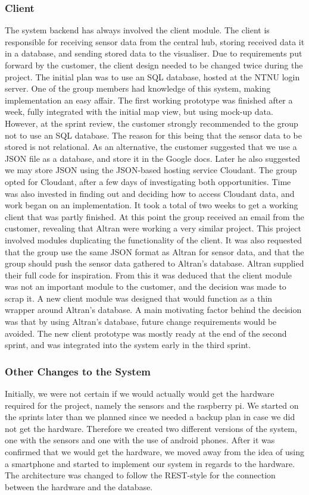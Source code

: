 \documentclass[../document.tex]{subfiles}
\begin{document}
\subsubsection{Client}
The system backend has always involved the client module. The client is responsible for receiving sensor data from the central hub, storing received data it in a database, and sending stored data to the visualiser. Due to requirements put forward by the customer, the client design needed to be changed twice during the project. The initial plan was to use an SQL database, hosted at the \gls{NTNU} login server. One of the group members had knowledge of this system, making implementation an easy affair. The first working prototype was finished after a week, fully integrated with the initial map view, but using mock-up data. However, at the sprint review, the customer strongly recommended to the group not to use an SQL database. The reason for this being that the sensor data to be stored is not relational. As an alternative, the customer suggested that we use a \gls{JSON} file as a database, and store it in the Google docs. Later he also suggested we may store \gls{JSON} using the \gls{JSON}-based hosting service Cloudant. The group opted for Cloudant, after a few days of investigating both opportunities. Time was also invested in finding out and deciding how to access Cloudant data, and work began on an implementation. It took a total of two weeks to get a working client that was partly finished. At this point the group received an email from the customer, revealing that Altran were working a very similar project. This project involved modules duplicating the functionality of the client. It was also requested that the group use the same \gls{JSON} format as Altran for sensor data, and that the group should push the sensor data gathered to Altran’s database. Altran supplied their full code for inspiration. From this it was deduced that the client module was not an important module to the customer, and the decision was made to scrap it. A new client module was designed that would function as a thin wrapper around Altran’s database. A main motivating factor behind the decision was that by using Altran’s database, future change requirements would be avoided. The new client prototype was mostly ready at the end of the second sprint, and was integrated into the system early in the third sprint.

\subsubsection{Other Changes to the System}
Initially, we were not certain if we would actually would get the hardware required for the project, namely the sensors and the raspberry pi. We started on the sprints later than we planned since we needed a backup plan in case we did not get the hardware. Therefore we created two different versions of the system, one with the sensors and one with the use of android phones. After it was confirmed that we would get the hardware, we moved away from the idea of using a smartphone and started to implement our system in regards to the hardware. The architecture was changed to follow the REST-style for the connection between the hardware and the database. 
\end{document}
